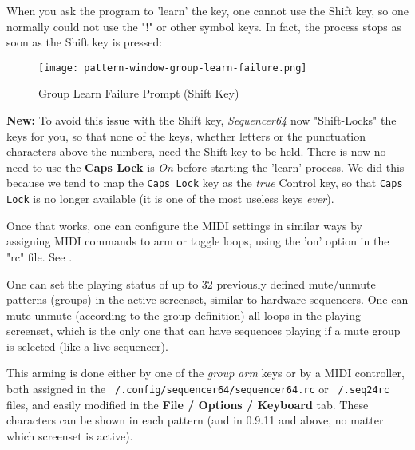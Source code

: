    When you ask the program to 'learn' the key, one cannot
   use the Shift key, so one normally could not use the "!" or
   other symbol keys.
   In fact, the process stops as soon as the Shift key is pressed:

\begin{figure}[H]
   \centering 
   \texttt{[image: pattern-window-group-learn-failure.png]}
   \caption{Group Learn Failure Prompt (Shift Key)}
   \label{fig:pattern_window_group_learn_failure}
\end{figure}

   \textbf{New:}
   To avoid this issue with the Shift key, \textsl{Sequencer64} now
   "Shift-Locks" the keys for you, so that none of the keys, whether letters or
   the punctuation characters above the numbers, need the Shift key to be held.
   There is now no need to use the \textbf{Caps Lock} is \textsl{On} before
   starting the 'learn' process.  We did this because we tend to map the
   \texttt{Caps Lock} key as the \textsl{true} Control key, so that
   \texttt{Caps Lock} is no longer available
   (it is one of the most useless keys \textsl{ever}).

   Once that works, one can configure the MIDI settings in similar ways
   by assigning MIDI commands to arm or toggle loops, using 
   the 'on' option in the "rc" file.
   See .

   One can set the playing status of up to 32 previously
   defined mute/unmute patterns (groups) in the active screenset, similar to
   hardware sequencers.  One can mute-unmute (according to the group
   definition) all loops in the playing screenset, which is the only one that
   can have sequences playing if a mute group is selected
   (like a live sequencer).

   This arming is done either by one of the \textsl{group arm} keys
   or by a MIDI controller, both assigned in the
   \texttt{~/.config/sequencer64/sequencer64.rc} or \texttt{~/.seq24rc} files,
   and easily modified in the \textbf{File / Options / Keyboard} tab.
   These characters can be shown in each pattern (and in 0.9.11 and above, no
   matter which screenset is active).

